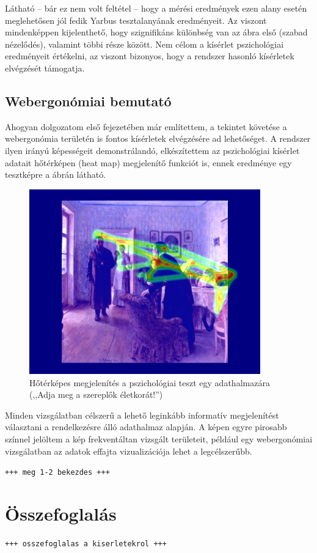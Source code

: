 Látható -- bár ez nem volt feltétel -- hogy a mérési eredmények ezen alany esetén meglehetősen jól fedik Yarbus tesztalanyának eredményeit. Az viszont mindenképpen kijelenthető, hogy szignifikáns különbség van az ábra első (szabad nézelődés), valamint többi része között. Nem célom a kísérlet pszichológiai eredményeit értékelni, az viszont bizonyos, hogy a rendszer hasonló kísérletek elvégzését támogatja.

\subsection{Webergonómiai bemutató}\label{sect:web}

Ahogyan dolgozatom első fejezetében már említettem, a tekintet követése a webergonómia területén is fontos kísérletek elvégzésére ad lehetőséget. A rendszer ilyen irányú képességeit demonstrálandó, elkészítettem az pszichológiai kísérlet adatait hőtérképen (heat map) megjelenítő funkciót is, ennek eredménye egy tesztképre a  ábrán látható.

\begin{figure}[!ht]
\centering
\includegraphics[width=100mm, keepaspectratio]{figures/heatmap.jpg}
\caption{Hőtérképes megjelenítés a pszichológiai teszt egy adathalmazára (,,Adja meg a szereplők életkorát!'')}
\label{fig:heatmap}
\end{figure}

Minden vizsgálatban célszerű a lehető leginkább informatív megjelenítést választani a rendelkezésre álló adathalmaz alapján. A képen egyre pirosabb színnel jelöltem a kép frekventáltan vizsgált területeit, például egy webergonómiai vizsgálatban az adatok effajta vizualizációja lehet a legcélszerűbb.

\bigskip

\texttt{+++ meg 1-2 bekezdes +++}

\section{Összefoglalás}\label{sect:kiserlet_osszefoglalas}

\texttt{+++ osszefoglalas a kiserletekrol +++}